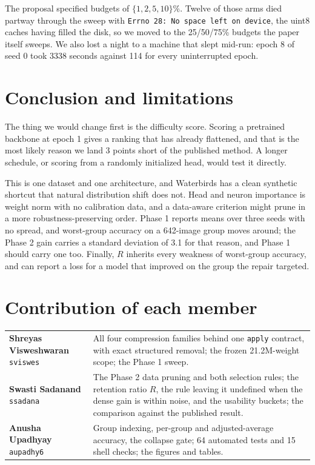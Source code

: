 \documentclass[11pt]{article}
\begin{document}
The proposal specified budgets of $\{1, 2, 5, 10\}\%$. Twelve of those arms
died partway through the sweep with \texttt{Errno 28: No space left on
device}, the uint8 caches having filled the disk, so we moved to the
25/50/75\% budgets the paper itself sweeps. We also lost a
night to a machine that slept mid-run: epoch 8 of seed 0 took 3338 seconds
against 114 for every uninterrupted epoch.

\section{Conclusion and limitations}

The thing we would change first is the difficulty score. Scoring a pretrained
backbone at epoch 1 gives a ranking that has already flattened, and that is
the most likely reason we land 3 points short of the published method. A
longer schedule, or scoring from a randomly initialized head, would test it
directly.

This is one dataset and one architecture, and
Waterbirds has a clean synthetic shortcut that natural distribution shift does
not. Head and neuron importance is weight norm with no calibration data, and a
data-aware criterion might prune in a more robustness-preserving order. Phase
1 reports means over three seeds with no spread, and worst-group accuracy on a
642-image group moves around; the Phase 2 gain carries a standard deviation of
3.1 for that reason, and Phase 1 should carry one too. Finally, $R$ inherits every weakness of worst-group accuracy, and can report a
loss for a model that improved on the group the repair targeted.

\section*{Contribution of each member}

\begin{table}[H]
\centering
\footnotesize
\begin{tabular}{@{}>{\raggedright\arraybackslash}p{}p{}@{}}
\toprule
\textbf{Shreyas Visweshwaran} \texttt{sviswes}
& All four compression families behind one \texttt{apply} contract, with
exact structured removal; the frozen 21.2M-weight scope; the Phase 1 sweep. \\
\addlinespace
\textbf{Swasti Sadanand} \texttt{ssadana}
& The Phase 2 data pruning and both selection rules; the retention ratio $R$,
the rule leaving it undefined when the dense gain is within noise, and the
usability buckets; the comparison against the published result. \\
\addlinespace
\textbf{Anusha Upadhyay} \texttt{aupadhy6}
& Group indexing, per-group and adjusted-average accuracy, the collapse gate;
64 automated tests and 15 shell checks; the figures and tables. \\
\bottomrule
\end{tabular}
\end{table}

\setlength{\bibsep}{0pt plus 0.3ex}
{\footnotesize}
\end{document}
